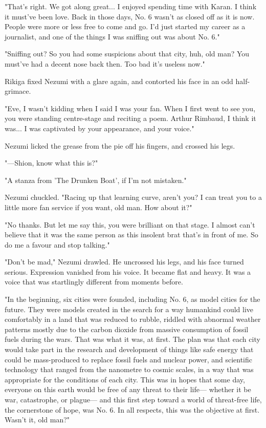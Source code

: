 "That's right. We got along great... I enjoyed spending time with Karan.
I think it must've been love. Back in those days, No. 6 wasn't as closed
off as it is now. People were more or less free to come and go. I'd just
started my career as a journalist, and one of the things I was sniffing
out was about No. 6."

"Sniffing out? So you had some suspicions about that city, huh, old man?
You must've had a decent nose back then. Too bad it's useless now."

Rikiga fixed Nezumi with a glare again, and contorted his face in an odd
half-grimace.

"Eve, I wasn't kidding when I said I was your fan. When I first went to
see you, you were standing centre-stage and reciting a poem. Arthur
Rimbaud, I think it was... I was captivated by your appearance, and your
voice."

Nezumi licked the grease from the pie off his fingers, and crossed his
legs.


"---Shion, know what this is?"

"A stanza from 'The Drunken Boat', if I'm not mistaken."

Nezumi chuckled. "Racing up that learning curve, aren't you? I can treat
you to a little more fan service if you want, old man. How about it?"

"No thanks. But let me say this, you were brilliant on that stage. I
almost can't believe that it was the same person as this insolent brat
that's in front of me. So do me a favour and stop talking."

"Don't be mad," Nezumi drawled. He uncrossed his legs, and his face
turned serious. Expression vanished from his voice. It became flat and
heavy. It was a voice that was startlingly different from moments
before.

"In the beginning, six cities were founded, including No. 6, as model
cities for the future. They were models created in the search for a way
humankind could live comfortably in a land that was reduced to rubble,
riddled with abnormal weather patterns mostly due to the carbon dioxide
from massive consumption of fossil fuels during the wars. That was what
it was, at first. The plan was that each city would take part in the
research and development of things like safe energy that could be
mass-produced to replace fossil fuels and nuclear power, and scientific
technology that ranged from the nanometre to cosmic scales, in a way
that was appropriate for the conditions of each city. This was in hopes
that some day, everyone on this earth would be free of any threat to
their life--- whether it be war, catastrophe, or plague--- and this first
step toward a world of threat-free life, the cornerstone of hope, was
No. 6. In all respects, this was the objective at first. Wasn't it, old
man?"

